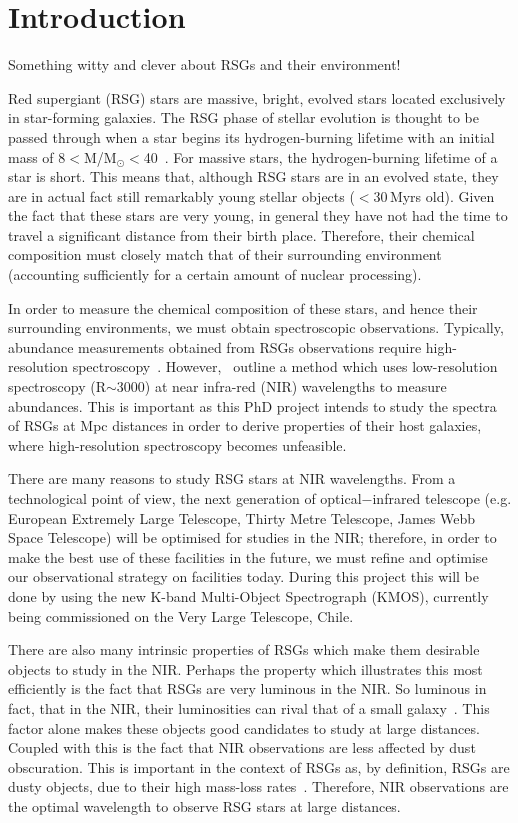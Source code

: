 \chapter{Introduction}

Something witty and clever about RSGs and their environment!



Red supergiant (RSG) stars are massive, bright, evolved stars located exclusively in star-forming galaxies.
The RSG phase of stellar evolution is thought to be passed through when a star begins its hydrogen-burning lifetime with an initial mass of 8$<$M/M$_{\odot}<$40~\citep{Massey03, Crowther07, Meynet11}.
For massive stars, the hydrogen-burning lifetime of a star is short.
This means that, although RSG stars are in an evolved state, they are in actual fact still remarkably young stellar objects ($<$30\,Myrs old).
Given the fact that these stars are very young, in general they have not had the time to travel a significant distance from their birth place.
Therefore, their chemical composition must closely match that of their surrounding environment (accounting sufficiently for a certain amount of nuclear processing).


In order to measure the chemical composition of these stars, and hence their surrounding environments, we must obtain spectroscopic observations.
Typically, abundance measurements obtained from RSGs observations require high-resolution spectroscopy~\citep[R$\ge$ 20\,000;][]{Cunha07, Davies09a, Davies09b}.
However,~\cite{2010MNRAS.407.1203D} outline a method which uses low-resolution spectroscopy (R$\sim$3000) at near infra-red (NIR) wavelengths to measure abundances.
This is important as this PhD project intends to study the spectra of RSGs at Mpc distances in order to derive properties of their host galaxies, where high-resolution spectroscopy becomes unfeasible.


There are many reasons to study RSG stars at NIR wavelengths.
From a technological point of view, the next generation of optical$-$infrared telescope (e.g. European Extremely Large Telescope, Thirty Metre Telescope, James Webb Space Telescope) will be optimised for studies in the NIR; therefore, in order to make the best use of these facilities in the future, we must refine and optimise our observational strategy on facilities today.
During this project this will be done by using the new K-band Multi-Object Spectrograph (KMOS), currently being commissioned on the Very Large Telescope, Chile.


There are also many intrinsic properties of RSGs which make them desirable objects to study in the NIR.
Perhaps the property which illustrates this most efficiently is the fact that RSGs are very luminous in the NIR.
So luminous in fact, that in the NIR, their luminosities can rival that of a small galaxy~\citep{2010MNRAS.407.1203D}.
This factor alone makes these objects good candidates to study at large distances.
Coupled with this is the fact that NIR observations are less affected by dust obscuration.
This is important in the context of RSGs as, by definition, RSGs are dusty objects, due to their high mass-loss rates~\citep[e.g.][]{Danchi94}.
Therefore, NIR observations are the optimal wavelength to observe RSG stars at large distances.

